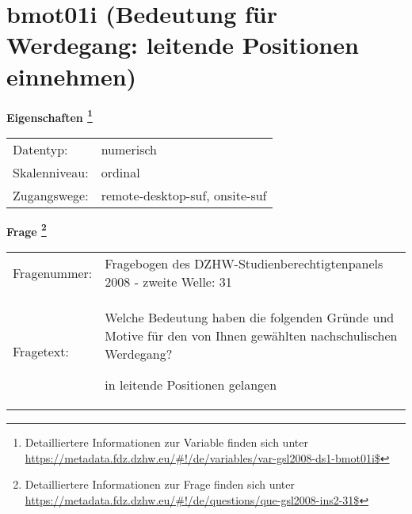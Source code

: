 
    \setcounter{footnote}{0}

    \vspace*{-1.8cm}
	\section{bmot01i (Bedeutung für Werdegang: leitende Positionen einnehmen)}
	\label{section:bmot01i}



    \vspace*{0.5cm}
    \noindent\textbf{Eigenschaften
	\footnote{Detailliertere Informationen zur Variable finden sich unter
		\url{https://metadata.fdz.dzhw.eu/\#!/de/variables/var-gsl2008-ds1-bmot01i$}}}\\
	\begin{tabularx}{\hsize}{@{}lX}
	Datentyp: & numerisch \\
	Skalenniveau: & ordinal \\
	Zugangswege: &
	  remote-desktop-suf, 
	  onsite-suf
 \\
    \end{tabularx}



				\vspace*{0.5cm}
                \noindent\textbf{Frage
	                \footnote{Detailliertere Informationen zur Frage finden sich unter
		              \url{https://metadata.fdz.dzhw.eu/\#!/de/questions/que-gsl2008-ins2-31$}}}\\
				\begin{tabularx}{\hsize}{@{}lX}
					Fragenummer: &
					  Fragebogen des DZHW-Studienberechtigtenpanels 2008 - zweite Welle:
					  31
 \\
					Fragetext: & Welche Bedeutung haben die folgenden Gründe und Motive für den von Ihnen gewählten nachschulischen Werdegang?\par  in leitende Positionen gelangen \\
				\end{tabularx}





